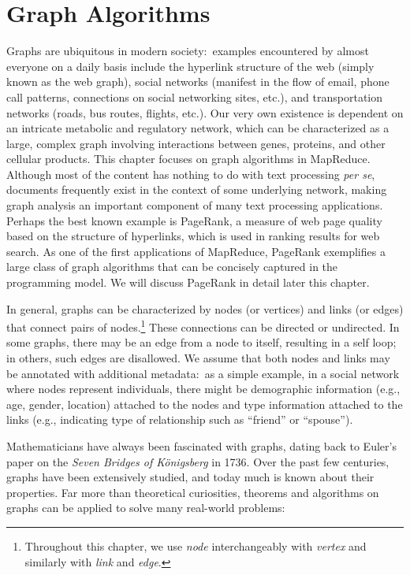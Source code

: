\chapter{Graph Algorithms}
\label{chapter-graphs}

Graphs are ubiquitous in modern society:\ examples encountered by
almost everyone on a daily basis include the hyperlink structure of
the web (simply known as the web graph), social networks (manifest in
the flow of email, phone call patterns, connections on social
networking sites, etc.), and transportation networks (roads, bus
routes, flights, etc.).  Our very own existence is dependent on an
intricate metabolic and regulatory network, which can be characterized
as a large, complex graph involving interactions between genes,
proteins, and other cellular products.  This chapter focuses on graph
algorithms in MapReduce.  Although most of the content has nothing to
do with text processing \emph{per se}, documents frequently exist in
the context of some underlying network, making graph analysis an
important component of many text processing applications.  Perhaps the
best known example is PageRank, a measure of web page quality based on
the structure of hyperlinks, which is used in ranking results for web
search.  As one of the first applications of MapReduce, PageRank
exemplifies a large class of graph algorithms that can be concisely
captured in the programming model.  We will discuss PageRank in detail
later this chapter.

In general, graphs can be characterized by nodes (or vertices) and
links (or edges) that connect pairs of nodes.\footnote{Throughout this
  chapter, we use \emph{node} interchangeably with \emph{vertex} and
  similarly with \emph{link} and \emph{edge}.}  These connections can be
directed or undirected.  In some graphs, there may be an edge from a
node to itself, resulting in a self loop; in others, such edges are
disallowed.  We assume that both nodes and links may be annotated with
additional metadata:\ as a simple example, in a social network where
nodes represent individuals, there might be demographic information
(e.g., age, gender, location) attached to the nodes and type
information attached to the links (e.g., indicating type of
relationship such as ``friend'' or ``spouse'').

Mathematicians have always been fascinated with graphs, dating back to
Euler's paper on the \emph{Seven Bridges of K\"{o}nigsberg} in 1736.
Over the past few centuries, graphs have been extensively studied, and
today much is known about their properties.  Far more than theoretical
curiosities, theorems and algorithms on graphs can be applied to solve
many real-world problems:

